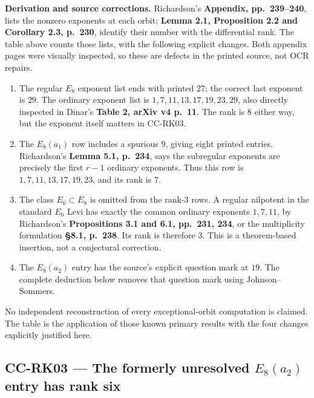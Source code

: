 \textbf{Derivation and source corrections.} Richardson's \textbf{Appendix, pp.~239--240}, lists the nonzero exponents at each orbit; \textbf{Lemma 2.1, Proposition 2.2 and Corollary 2.3, p.~230}, identify their number with the differential rank. The table above counts those lists, with the following explicit changes. Both appendix pages were visually inspected, so these are defects in the printed source, not OCR repairs.

\begin{enumerate}
\def\labelenumi{\arabic{enumi}.}
\item
  The regular \(E_8\) exponent list ends with printed \(27\); the correct last exponent is \(29\). The ordinary exponent list is \(1,7,11,13,17,19,23,29\), also directly inspected in Dinar's \textbf{Table 2, arXiv v4 p.~11}. The rank is \(8\) either way, but the exponent itself matters in CC-RK03.
\item
  The \(E_8(a_1)\) row includes a spurious \(9\), giving eight printed entries. Richardson's \textbf{Lemma 5.1, p.~234}, says the subregular exponents are precisely the first \(r-1\) ordinary exponents. Thus this row is \(1,7,11,13,17,19,23\), and its rank is \(7\).
\item
  The class \(E_6\subset E_8\) is omitted from the rank-\(3\) rows. A regular nilpotent in the standard \(E_6\) Levi has exactly the common ordinary exponents \(1,7,11\), by Richardson's \textbf{Propositions 3.1 and 6.1, pp.~231, 234}, or the multiplicity formulation \textbf{§8.1, p.~238}. Its rank is therefore \(3\). This is a theorem-based insertion, not a conjectural correction.
\item
  The \(E_8(a_2)\) entry has the source's explicit question mark at \(19\). The complete deduction below removes that question mark using Johnson--Sommers.
\end{enumerate}

No independent reconstruction of every exceptional-orbit computation is claimed. The table is the application of those known primary results with the four changes explicitly justified here.

\subsection{\texorpdfstring{CC-RK03 --- The formerly unresolved \(E_8(a_2)\) entry has rank six}{CC-RK03 --- The formerly unresolved E\_8(a\_2) entry has rank six}}\label{cc-rk03-the-formerly-unresolved-e_8a_2-entry-has-rank-six}

